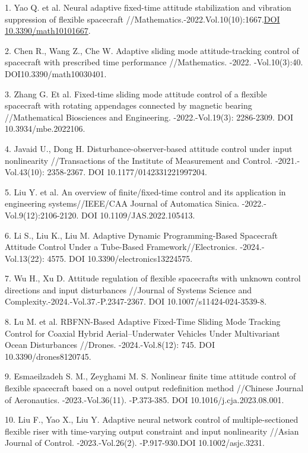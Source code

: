 \begin{refs}
1. Yao Q. et al. Neural adaptive fixed-time attitude stabilization and
vibration suppression of flexible spacecraft
//Mathematics.-2022.Vol.10(10):1667.\href{https://doi.org/10.3390/math10101667}{DOI
10.3390/math10101667}.

2. Chen R., Wang Z., Che W. Adaptive sliding mode attitude-tracking
control of spacecraft with prescribed time performance //Mathematics.
-2022. -Vol.10(3):40. DOI10.3390/math10030401.

3. Zhang G. Et al. Fixed-time sliding mode attitude control of a flexible
spacecraft with rotating appendages connected by magnetic bearing
//Mathematical Biosciences and Engineering. -2022.-Vol.19(3): 2286-2309.
DOI 10.3934/mbe.2022106.

4. Javaid U., Dong H. Disturbance-observer-based attitude control under
input nonlinearity //Transactions of the Institute of Measurement and
Control. -2021.-Vol.43(10): 2358-2367. DOI 10.1177/0142331221997204.

5. Liu Y. et al. An overview of finite/fixed-time control and its
application in engineering systems//IEEE/CAA Journal of Automatica
Sinica. -2022.-Vol.9(12):2106-2120. DOI 10.1109/JAS.2022.105413.

6. Li S., Liu K., Liu M. Adaptive Dynamic Programming-Based Spacecraft
Attitude Control Under a Tube-Based Framework//Electronics.
-2024.-Vol.13(22): 4575. DOI 10.3390/electronics13224575.

7. Wu H., Xu D. Attitude regulation of flexible spacecrafts with unknown
control directions and input disturbances //Journal of Systems Science
and Complexity.-2024.-Vol.37.-P.2347-2367. DOI
10.1007/s11424-024-3539-8.

8. Lu M. et al. RBFNN-Based Adaptive Fixed-Time Sliding Mode Tracking
Control for Coaxial Hybrid Aerial--Underwater Vehicles Under
Multivariant Ocean Disturbances //Drones. -2024.-Vol.8(12): 745. DOI
10.3390/drones8120745.

9. Esmaeilzadeh S. M., Zeyghami M. S. Nonlinear finite time attitude
control of flexible spacecraft based on a novel output redefinition
method //Chinese Journal of Aeronautics. -2023.-Vol.36(11). -P.373-385.
DOI 10.1016/j.cja.2023.08.001.

10. Liu F., Yao X., Liu Y. Adaptive neural network control of
multiple-sectioned flexible riser with time-varying output constraint
and input nonlinearity //Asian Journal of Control. -2023.-Vol.26(2).
-P.917-930.DOI 10.1002/asjc.3231.


\end{refs}
